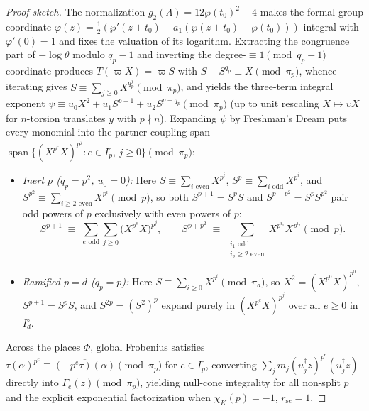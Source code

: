 \documentclass[11pt]{amsart}
\theoremstyle{definition}
\theoremstyle{remark}
\begin{document}
\begin{proof}[Proof sketch]
The normalization $g_2(\Lambda)=12\wp(t_0)^2-4$ makes the formal-group coordinate $\varphi(z)=\frac12(\wp'(z+t_0)-a_1(\wp(z+t_0)-\wp(t_0)))$ integral with $\varphi'(0)=1$ and fixes the valuation of its logarithm. Extracting the congruence part of $-\log\theta$ modulo $q_p-1$ and inverting the degree-$\equiv 1\pmod{q_p-1}$ coordinate produces $T(\varpi X)=\varpi S$ with $S-S^{q_p}\equiv X\pmod{\pi_p}$, whence iterating gives $S\equiv\sum_{j\ge 0}X^{q_p^j}\pmod{\pi_p}$, and yields the three-term integral exponent $\psi\equiv u_0 X^2+u_1 S^{p+1}+u_2 S^{p+q_p}\pmod{\pi_p}$ (up to unit rescaling $X\mapsto\upsilon X$ for $n$-torsion translates $y$ with $p\nmid n$). Expanding $\psi$ by Freshman's Dream puts every monomial into the partner-coupling span $\operatorname{span}\{(X^{p^e}X)^{p^j}:e\in I_p^\circ,\,j\ge 0\}\pmod{\pi_p}$:
\begin{itemize}
\item \emph{Inert $p$ ($q_p=p^2$, $u_0=0$):} Here $S\equiv\sum_{i\text{ even}}X^{p^i}$, $S^p\equiv\sum_{i\text{ odd}}X^{p^i}$, and $S^{p^2}\equiv\sum_{i\ge 2\text{ even}}X^{p^i}\pmod p$, so both $S^{p+1}=S^p S$ and $S^{p+p^2}=S^p S^{p^2}$ pair odd powers of $p$ exclusively with even powers of $p$:
\[
 S^{p+1} \;\equiv\; \sum_{e\text{ odd}}\sum_{j\ge 0}\bigl(X^{p^e}X\bigr)^{p^j},\qquad
 S^{p+p^2} \;\equiv\; \sum_{\substack{i_1\text{ odd}\\i_2\ge 2\text{ even}}}X^{p^{i_1}}X^{p^{i_2}} \pmod p.
\]
\item \emph{Ramified $p=d$ ($q_p=p$):} Here $S\equiv\sum_{i\ge 0}X^{p^i}\pmod{\pi_d}$, so $X^2=(X^{p^0}X)^{p^0}$, $S^{p+1}=S^p S$, and $S^{2p}=(S^2)^p$ expand purely in $(X^{p^e}X)^{p^j}$ over all $e\ge 0$ in $I_d^\circ$.
\end{itemize}
Across the places $\Phi$, global Frobenius satisfies $\tau(\alpha)^{p^e}\equiv\overline{(-p^e\tau)(\alpha)}\pmod{\pi_p}$ for $e\in I_p^\circ$, converting $\sum_j m_j(u_j^\dagger z)^{p^e}(u_j^\dagger z)$ directly into $\Gamma_e(z)\pmod{\pi_p}$, yielding null-cone integrality for all non-split $p$ and the explicit exponential factorization when $\chi_K(p)=-1$, $r_{\mathrm{sc}}=1$.
\end{proof}
\end{document}
